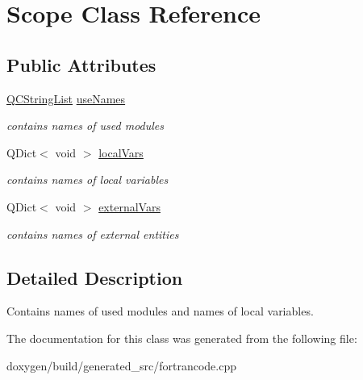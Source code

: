 \hypertarget{class_scope}{}\section{Scope Class Reference}
\label{class_scope}
\subsection*{Public Attributes}
\begin{DoxyCompactItemize}
\item 
\mbox{\label{class_scope_ad51ffa82e7814b89a49d0c4c231aa44f}} 
\mbox{\hyperlink{class_q_c_string_list}{Q\+C\+String\+List}} \mbox{\hyperlink{class_scope_ad51ffa82e7814b89a49d0c4c231aa44f}{use\+Names}}
\begin{DoxyCompactList}\small\item\em contains names of used modules \end{DoxyCompactList}\item 
\mbox{\label{class_scope_a6de2f3f270f07c7e66130069b778dd21}} 
Q\+Dict$<$ void $>$ \mbox{\hyperlink{class_scope_a6de2f3f270f07c7e66130069b778dd21}{local\+Vars}}
\begin{DoxyCompactList}\small\item\em contains names of local variables \end{DoxyCompactList}\item 
\mbox{\label{class_scope_abdc28ff085cc229dfd09940f4f7ea40b}} 
Q\+Dict$<$ void $>$ \mbox{\hyperlink{class_scope_abdc28ff085cc229dfd09940f4f7ea40b}{external\+Vars}}
\begin{DoxyCompactList}\small\item\em contains names of external entities \end{DoxyCompactList}\end{DoxyCompactItemize}


\subsection{Detailed Description}
Contains names of used modules and names of local variables. 

The documentation for this class was generated from the following file\+:\begin{DoxyCompactItemize}
\item 
doxygen/build/generated\+\_\+src/fortrancode.\+cpp\end{DoxyCompactItemize}
